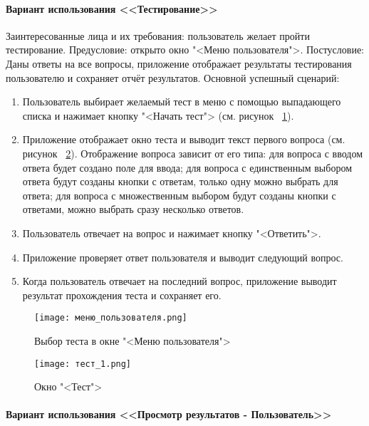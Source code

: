 \paragraph{Вариант использования <<Тестирование>>}

Заинтересованные лица и их требования: пользователь желает пройти тестирование.
\newline Предусловие: открыто окно "<Меню пользователя">.
\newline Постусловие: Даны ответы на все вопросы, приложение отображает результаты тестирования пользователю и сохраняет отчёт результатов.
\newline Основной успешный сценарий:
\begin{enumerate}
	\item Пользователь выбирает желаемый тест в меню с помощью выпадающего списка и нажимает кнопку "<Начать тест"> (см. рисунок ~\ref{user_menu_window:image}).
	\item Приложение отображает окно теста и выводит текст первого вопроса (см. рисунок ~\ref{test_window:image}). Отображение вопроса зависит от его типа: для вопроса с вводом ответа будет создано поле для ввода; для вопроса с единственным выбором ответа будут созданы кнопки с ответам, только одну можно выбрать для ответа; для вопроса с множественным выбором будут созданы кнопки с ответами, можно выбрать сразу несколько ответов.
	\item Пользователь отвечает на вопрос и нажимает кнопку "<Ответить">.
	\item Приложение проверяет ответ пользователя и выводит следующий вопрос. 
	\item Когда пользователь отвечает на последний вопрос, приложение выводит результат прохождения теста и сохраняет его.
\end{enumerate}

\newpage
\begin{figure}[ht]
	\centering
	\texttt{[image: меню\_пользователя.png]}
	\caption{Выбор теста в окне "<Меню пользователя">}
	\label{user_menu_window:image}
\end{figure}
\begin{figure}[ht]
	\centering
	\texttt{[image: тест\_1.png]}
	\caption{Окно "<Тест">}
	\label{test_window:image}
\end{figure}

\paragraph{Вариант использования <<Просмотр результатов - Пользователь>>}

